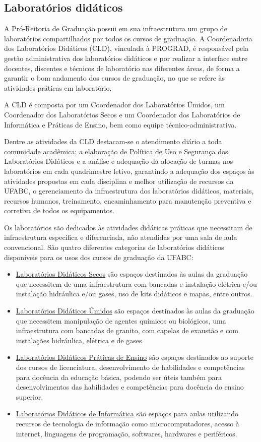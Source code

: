 \subsection{Laboratórios didáticos}

A Pró-Reitoria de Graduação possui em sua infraestrutura um grupo de
laboratórios compartilhados por todos os cursos de graduação. 
A Coordenadoria dos Laboratórios Didáticos (CLD), vinculada à PROGRAD, é
responsável pela gestão administrativa dos laboratórios didáticos e por
realizar a interface entre docentes, discentes e técnicos de laboratório nas
diferentes áreas, de forma a garantir o bom andamento dos cursos de graduação,
no que se refere às atividades práticas em laboratório.

A CLD é composta por um Coordenador dos Laboratórios Úmidos, um Coordenador dos
Laboratórios Secos e um Coordenador dos Laboratórios de Informática e Práticas
de Ensino, bem como equipe técnico-administrativa. 

Dentre as atividades da CLD destacam-se o atendimento diário a toda comunidade
acadêmica; a elaboração de Política de Uso e Segurança dos Laboratórios
Didáticos e a análise e adequação da alocação de turmas nos laboratórios em
cada quadrimestre letivo, garantindo a adequação dos espaços às atividades
propostas em cada disciplina e melhor utilização de recursos da UFABC, o
gerenciamento da infraestrutura dos laboratórios didáticos, materiais, recursos
humanos, treinamento, encaminhamento para manutenção preventiva e corretiva de
todos os equipamentos. 

Os laboratórios são dedicados às atividades didáticas práticas que necessitam
de infraestrutura específica e diferenciada, não atendidas por uma sala de aula
convencional. 
São quatro diferentes categorias de laboratórios didáticos disponíveis para os
usos dos cursos de graduação da UFABC: 
\begin{itemize}
    \item \underline{Laboratórios Didáticos Secos} são espaços destinados às
    aulas da graduação que necessitem de uma infraestrutura com bancadas e
    instalação elétrica e/ou instalação hidráulica e/ou gases, uso de kits
    didáticos e mapas, entre outros.
    \item \underline{Laboratórios Didáticos Úmidos} são espaços destinados às
    aulas da graduação que necessitem manipulação de agentes químicos ou
    biológicos, uma infraestrutura com bancadas de granito, com capelas de
    exaustão e com instalações hidráulica, elétrica e de gases
    \item \underline{Laboratórios Didáticos Práticas de Ensino} são espaços
    destinados ao suporte dos cursos de licenciatura, desenvolvimento de
    habilidades e competências para docência da educação básica, podendo ser
    úteis também para desenvolvimentos das habilidades e competências para
    docência do ensino superior.
    \item \underline{Laboratórios Didáticos de Informática} são espaços para
    aulas utilizando recursos de tecnologia de informação como
    microcomputadores, acesso à internet, linguagens de programação, softwares,
    hardwares e periféricos.
\end{itemize}

